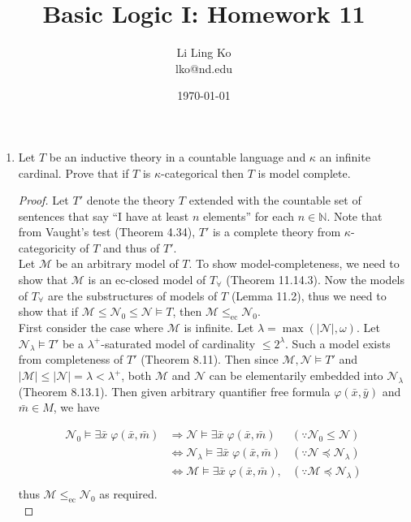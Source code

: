 \documentclass{article}
\begin{document}
\title{Basic Logic I: Homework 11}
\author{Li Ling Ko\\ lko@nd.edu}
\date{\today}
\maketitle

\begin{enumerate}[label={\bf Q\arabic*:}]
  \item Let $T$ be an inductive theory in a countable language and $\kappa$
    an infinite cardinal. Prove that if $T$ is $\kappa$-categorical then
    $T$ is model complete.

    \begin{proof}
      Let $T'$ denote the theory $T$ extended with the countable set of
      sentences that say ``I have at least $n$ elements'' for each
      $n\in\mathbb{N}$. Note that from Vaught's test (Theorem 4.34), $T'$
      is a complete theory from $\kappa$-categoricity of $T$ and thus of
      $T'$. \\

      Let $\mathcal{M}$ be an arbitrary model of $T$. To show
      model-completeness, we need to show that $\mathcal{M}$ is an
      ec-closed model of $T_\forall$ (Theorem 11.14.3). Now the models of
      $T_\forall$ are the substructures of models of $T$ (Lemma 11.2), thus
      we need to show that if $\mathcal{M}\leq
      \mathcal{N}_0\leq\mathcal{N}\models T$,
      then $\mathcal{M}\leq_{\text{ec}}\mathcal{N}_0$. \\

      First consider the case where $\mathcal{M}$ is infinite. Let
      $\lambda=\max(|\mathcal{N}|,\omega)$. Let $\mathcal{N}_\lambda\models
      T'$ be a $\lambda^+$-saturated model of cardinality $\leq2^\lambda$.
      Such a model exists from completeness of $T'$ (Theorem 8.11). Then
      since $\mathcal{M},\mathcal{N}\models T'$ and
      $|\mathcal{M}|\leq|\mathcal{N}|=\lambda<\lambda^+$, both
      $\mathcal{M}$ and $\mathcal{N}$ can be elementarily embedded into
      $\mathcal{N}_\lambda$ (Theorem 8.13.1). Then given arbitrary
      quantifier free formula $\varphi(\bar{x},\bar{y})$ and $\bar{m}\in
      M$, we have

      \begin{align*}
        \mathcal{N}_0\models \exists\bar{x}\; \varphi(\bar{x},\bar{m})
          &\Rightarrow\mathcal{N}\models \exists\bar{x}\;
          \varphi(\bar{x},\bar{m}) &(\because \mathcal{N}_0\leq\mathcal{N})
          \\
          &\Leftrightarrow\mathcal{N}_\lambda\models \exists\bar{x}\;
            \varphi(\bar{x},\bar{m}) &(\because
            \mathcal{N}\preceq\mathcal{N}_\lambda) \\
          &\Leftrightarrow\mathcal{M}\models \exists\bar{x}\;
            \varphi(\bar{x},\bar{m}), &(\because
            \mathcal{M}\preceq\mathcal{N}_\lambda) \\
      \end{align*}
      thus $\mathcal{M}\leq_{\text{ec}}\mathcal{N}_0$ as required. \\


\end{proof}
\end{enumerate}
\end{document}
